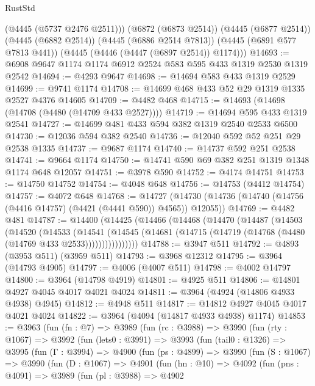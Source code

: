 \begin{lexlean}{RustStd}
\begin{coremodule}
{\begin{coremodule}
{{{{{{{{{{{{{{{{{{{{{{{{{{{{{{{{{{{{{{        (@4445 (@5737 @2476 @2511)))
      (@6872 (@6873 @2514))
      (@4445 (@6877 @2514))
      (@4445 (@6882 @2514))
      (@4445 (@6886 @2514 @7813))
      (@4445 (@6891 @577 @7813 @441))
      (@4445 (@4446 (@4447 (@6897 @2514)) @1174)))
@14693 := @6908 @9647 @1174 @1174 @6912 @2524 @583 @595 @433 @1319 @2530 @1319 @2542
@14694 := @4293 @9647
@14698 := @14694 @583 @433 @1319 @2529
@14699 := @9741 @1174
@14708 := @14699 @468 @433 @52 @29 @1319 @1335 @2527 @4376 @14605
@14709 := @4482 @468
@14715 := @14693 (@14698 (@14708 (@4480 (@14709 @433 @2527))))
@14719 := @14694 @595 @433 @1319 @2541
@14727 := @14699 @481 @433 @594 @382 @1319 @2540 @2533 @6500
@14730 := @12036 @594 @382 @2540
@14736 := @12040 @592 @52 @251 @29 @2538 @1335
@14737 := @9687 @1174
@14740 := @14737 @592 @251 @2538
@14741 := @9664 @1174
@14750 := @14741 @590 @69 @382 @251 @1319 @1348 @1174 @648 @12057
@14751 := @3978 @590
@14752 := @4174 @14751
@14753 := @14750 @14752
@14754 := @4048 @648
@14756 := @14753 (@4412 @14754)
@14757 := @4072 @648
@14768 := @14727
    (@14730 (@14736 (@14740 (@14756 (@4416 @14757) (@4421 (@4441 @590)) @4565)) @12055))
@14769 := @4482 @481
@14787 := @14400
    (@14425
      (@14466
        (@14468
          (@14470
            (@14487
              (@14503
                (@14520
                  (@14533
                    (@14541
                      (@14545
                        (@14681 (@14715 (@14719 (@14768 (@4480 (@14769 @433 @2533))))))))))))))))
@14788 := @3947 @511
@14792 := @4893 (@3953 @511) (@3959 @511)
@14793 := @3968 @12312
@14795 := @3964 (@14793 @4905)
@14797 := @4006 (@4007 @511)
@14798 := @4002 @14797
@14800 := @3964 (@14798 @4919)
@14801 := @4925 @511
@14806 := @14801 @4927 @4045 @4017 @4021 @4024
@14811 := @3964 (@4924 (@14806 @4933 @4938) @4945)
@14812 := @4948 @511
@14817 := @14812 @4927 @4045 @4017 @4021 @4024
@14822 := @3964 (@4094 (@14817 @4933 @4938) @1174)
@14853 := @3963
    (fun (fn : @7) =>
    @3989
      (fun (rc : @3988) =>
      @3990
        (fun (rty : @1067) =>
        @3992
          (fun (lets0 : @3991) =>
          @3993
            (fun (tail0 : @1326) =>
            @3995
              (fun (Γ : @3994) =>
              @4900
                (fun (ps : @4899) =>
                @3990
                  (fun (S : @1067) =>
                  @3990
                    (fun (D : @1067) =>
                    @4901
                      (fun (hn : @10) =>
                      @4092
                        (fun (pns : @4091) =>
                        @3989
                          (fun (pl : @3988) =>
                          @4902
}}}}}}}}}}}}}}}}}}}}}}}}}}}}}}}}}}}}}}
\end{coremodule}}
\end{coremodule}
\end{lexlean}
